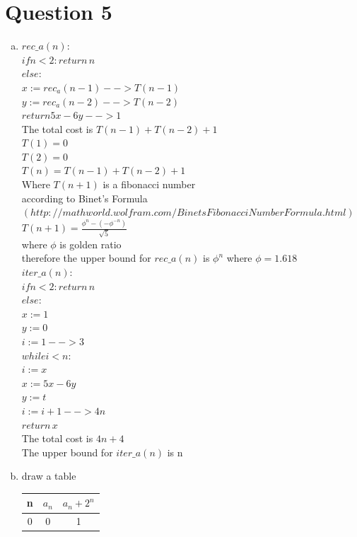 \documentclass[11pt, a4paper]{article}
\begin{document}
\section*{Question 5}
\begin{enumerate}[(a)]
    \item
    $rec\_a(n):$\\
    $if n<2: return\, n$\\
    $else:$\\
        $x:=rec_a(n-1) --> T(n-1)$\\
        $y:=rec_a(n-2) --> T(n-2)$\\
        $return 5x-6y --> 1$\\
    The total cost is $T(n-1)+T(n-2)+1$\\
    $T(1)=0$\\
    $T(2)=0$\\
    $T(n)=T(n-1)+T(n-2)+1$\\
    Where $T(n+1)$ is a fibonacci number\\
    according to Binet's Formula$(http://mathworld.wolfram.com/BinetsFibonacciNumberFormula.html)$\\
    $T(n+1) = \frac{\phi^n-(-\phi^{-n})}{\sqrt{5}}$\\
    where $\phi$ is golden ratio\\
    therefore the upper bound for $rec\_a(n)$ is $\phi^n$
    where $\phi=1.618$
    \\
    $iter\_a(n):$\\
    $if n<2: return\, n$\\
    $else:$\\
    $x:=1$\\
    $y:=0$\\
    $i:=1 --> 3$\\
    $while i<n:$\\
    $i:=x$\\
    $x:=5x-6y$\\
    $y:=t$\\
    $i:=i+1 --> 4n$\\
    $return\, x$\\
    The total cost is $4n+4$\\
    The upper bound for $iter\_a(n)$ is n
    \item
    draw a table\\
    \begin{tabular}{ | c | c | c | }
        \hline
        n & $a_n$ & $ a_n+2^n $ \\
        \hline
        0 & 0 & 1\\

\end{tabular}
\end{enumerate}
\end{document}
